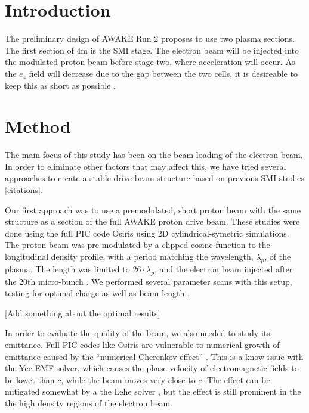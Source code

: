 \documentclass[aps,prstab,reprint,amsmath,amssymb,groupedaddress]{revtex4-1}
\begin{document}
\section[\label{S:I}]{Introduction}


The preliminary design of AWAKE Run 2 proposes to use two plasma sections. The first section of 4m is the SMI stage. The
electron beam will be injected into the modulated proton beam before stage two, where acceleration will occur. As the
$e_z$ field will decrease due to the gap between the two cells, it is desireable to keep this as short as possible
\cite{adli:2016}.

\section[\label{S:M}]{Method}

The main focus of this study has been on the beam loading of the electron beam. In order to eliminate other factors that
may affect this, we have tried several approaches to create a stable drive beam structure based on previous SMI studies
[citations].

Our first approach was to use a premodulated, short proton beam with the same structure as a section of the full AWAKE
proton drive beam. These studies were done using the full PIC code Osiris \cite{fonseca:2002} using 2D
cylindrical-symetric simulations. The proton beam was pre-modulated by a clipped cosine function to the longitudinal
density profile, with a period matching the wavelength, $\lambda_p$, of the plasma. The length was limited to
$26\cdot\lambda_p$, and the electron beam injected after the 20th micro-bunch \cite{berglyd_olsen:2015}. We performed
several parameter scans with this setup, testing for optimal charge as well as beam length
\cite{adli:2016, berglyd_olsen:2016}.

[Add something about the optimal results]

In order to evaluate the quality of the beam, we also needed to study its emittance. Full PIC codes like Osiris are
vulnerable to numerical growth of emittance caused by the ``numerical Cherenkov effect'' \cite{godfrey:1974}. This is a
know issue with the Yee EMF solver, which causes the phase velocity of electromagnetic fields to be lowet than $c$,
while the beam moves very close to $c$. The effect can be mitigated somewhat by a the Lehe solver \cite{lehe:2013}, but
the effect is still prominent in the the high density regions of the electron beam.
\end{document}
